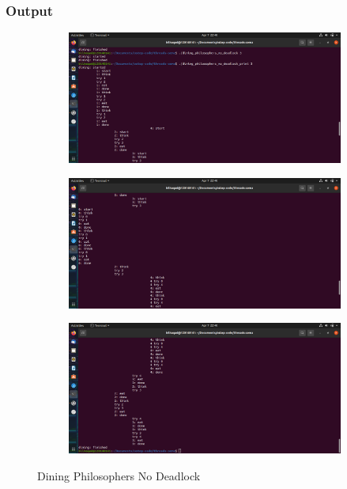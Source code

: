 \documentclass[11pt,a4paper]{article}
\begin{document}
\newpage
\subsubsection{Output}
\begin{figure}[h]
	\centering
	\begin{subfigure}[b]{0.4\textwidth}
		\centering
		\def\svgwidth{\columnwidth}
		\includegraphics[width=1\textwidth]{Figure1/dining_nodeadlock1.png}
		\label{fig:nodeadlock1}
	\end{subfigure}
	\qquad %
	\begin{subfigure}[b]{0.4\textwidth}
		\centering
		\def\svgwidth{\columnwidth}
		\includegraphics[width=1\textwidth]{Figure1/dining_nodeadlock2.png}
		\label{fig:nodeadlock2}
	\end{subfigure}
	\begin{subfigure}[b]{0.4\textwidth}
		\centering
		\def\svgwidth{\columnwidth}
		\includegraphics[width=1\textwidth]{Figure1/dining_nodeadlock3.png}
		\label{fig:nodeadlock3}
	\end{subfigure}
	\caption{Dining Philosophers No Deadlock}\label{fig:aug}
\end{figure}
\end{document}
